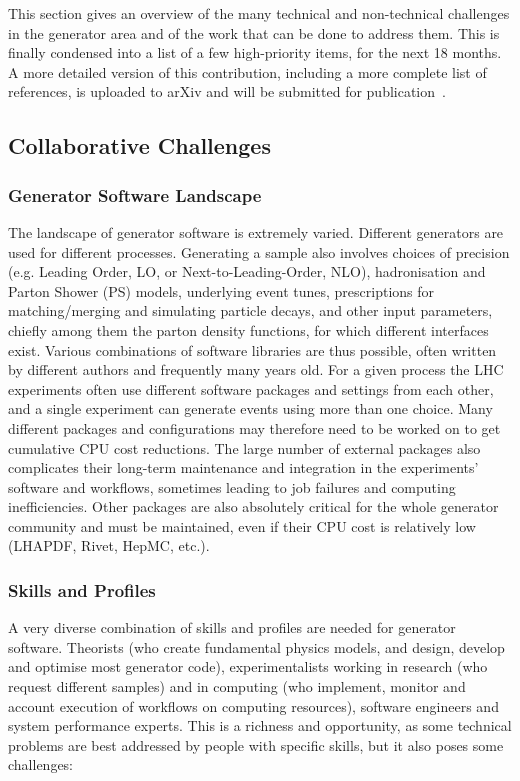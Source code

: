 This section gives an overview of the many technical and non-technical
challenges in the generator area and of the work that can be done to
address them. This is finally condensed into a list of a few
high-priority items, for the next 18 months. A more detailed version of this
contribution, including a more complete list of references, is
uploaded to arXiv and will be submitted for publication~\cite{Gen20}.

\hypertarget{collaboration-challenges}{%
\subsection{Collaborative Challenges}\label{collaboration-challenges}}

\subsubsection{Generator Software Landscape} 

The landscape of generator software is extremely varied. Different
generators are used for different processes. Generating a sample also
involves choices of precision (e.g. Leading Order, LO, or
Next-to-Leading-Order, NLO), hadronisation and Parton Shower (PS)
models, underlying event tunes, prescriptions for matching/merging and
simulating particle decays, and other input parameters, chiefly among
them the parton density functions, for which different interfaces exist.
Various combinations of software libraries are thus possible, often
written by different authors and frequently many years old. For a
given process the LHC experiments often use different software packages
and settings from each other, and a single experiment can generate
events using more than one choice. Many different packages and
configurations may therefore need to be worked on to get cumulative CPU
cost reductions. The large number of external packages also complicates
their long-term maintenance and integration in the experiments' software
and workflows, sometimes leading to job failures and computing
inefficiencies. Other packages are also absolutely critical for the
whole generator community and must be maintained, even if their CPU cost
is relatively low (LHAPDF, Rivet, HepMC, etc.).

\subsubsection{Skills and Profiles}

A very diverse combination of skills and profiles are needed for generator software.
Theorists
(who create fundamental physics models, and design, develop and optimise
most generator code), experimentalists working in research (who request
different samples) and in computing (who implement, monitor and
account execution of workflows on computing resources), software
engineers and system performance experts. This is a richness and
opportunity, as some technical problems are best addressed by people
with specific skills, but it also poses some challenges:

